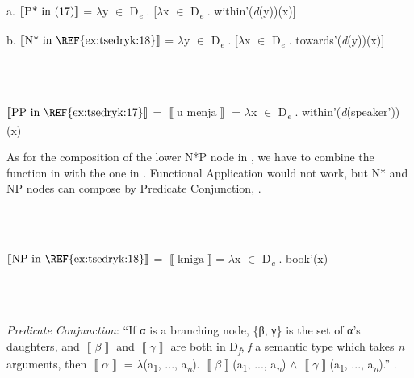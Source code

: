 \documentclass[output=paper,colorlinks,citecolor=brown]{./langscibook}
\begin{document}
          a.   $\left\llbracket \text{P* in (1}7\text )\right\rrbracket $ = ${\lambda}$y ${\in}$ D\textit{\textsubscript{e}}\textsubscript{} . [${\lambda}$x ${\in}$ D\textit{\textsubscript{e}} . within'(\textit{d}(y))(x)] 

  b.   $\left\llbracket \text{N* in \REF{ex:tsedryk:18}}\right\rrbracket $ = ${\lambda}$y ${\in}$ D\textit{\textsubscript{e}} . [${\lambda}$x ${\in}$ D\textit{\textsubscript{e}} . towards'(\textit{d}(y))(x)]  

\ea%
    \label{ex:tsedryk:22}
    \gll\\
        \\
    \glt
    \z

           $\left\llbracket \text{PP in \REF{ex:tsedryk:17}}\right\rrbracket $ =  $\left\llbracket \text{u menja}\right\rrbracket $ = ${\lambda}$x ${\in}$ D\textit{\textsubscript{e}} . within'(\textit{d}(speaker'))(x)

As for the composition of the lower N*P node in , we have to combine the function in  with the one in . Functional Application would not work, but N* and NP nodes can compose by Predicate Conjunction, .

\ea%
    \label{ex:tsedryk:23}
    \gll\\
        \\
    \glt
    \z

           $\left\llbracket \text{NP in \REF{ex:tsedryk:18}}\right\rrbracket $ =  $\left\llbracket \text{kniga}\right\rrbracket $= ${\lambda}$x ${\in}$ D\textit{\textsubscript{e}} . book'(x)

\ea%
    \label{ex:tsedryk:24}
    \gll\\
        \\
    \glt
    \z

          \textit{Predicate Conjunction}: “If α is a branching node, \{β, γ\} is the set of α’s daughters, and  $\left\llbracket \beta \right\rrbracket $  and  $\left\llbracket \gamma \right\rrbracket $  are both in D\textit{\textsubscript{f}}, \textit{f} a semantic type which takes \textit{n} arguments, then  $\left\llbracket \alpha \right\rrbracket $ = ${\lambda}$(a\textsubscript{1}, ..., a\textit{\textsubscript{n}}).  $\left\llbracket \beta \right\rrbracket $(a\textsubscript{1}, ..., a\textit{\textsubscript{n}}) ${\wedge}$  $\left\llbracket \gamma \right\rrbracket $(a\textsubscript{1}, ..., a\textit{\textsubscript{n}}).” \citep[41]{Myler2016}.
\end{document}
